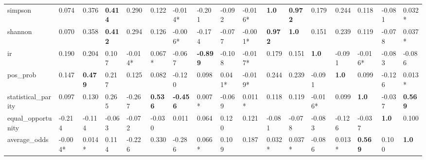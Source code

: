 \begin{tabular}{lllllllllllllllll}
simpson & 0.074 & 0.376 & \cellcolor{black!25}\textbf{0.414} & 0.290 & 0.122 & -0.014* & -0.201 & -0.092 & -0.016* & \cellcolor{black!25}\textbf{1.0} & \cellcolor{black!25}\textbf{0.972} & 0.179 & 0.244 & 0.118 & -0.081 & 0.032* \\
shannon & 0.070 & 0.358 & \cellcolor{black!25}\textbf{0.412} & 0.294 & 0.126 & -0.006* & -0.174 & -0.077 & -0.001* & \cellcolor{black!25}\textbf{0.972} & \cellcolor{black!25}\textbf{1.0} & 0.151 & 0.239 & 0.119 & -0.078 & 0.037* \\
ir & 0.190 & 0.204 & 0.107 & -0.014* & 0.067* & -0.067 & \cellcolor{black!25}\textbf{-0.899} & -0.108 & -0.017* & 0.179 & 0.151 & \cellcolor{black!25}\textbf{1.0} & -0.091 & -0.016* & -0.083 & -0.086 \\
pos_prob & 0.147 & \cellcolor{black!25}\textbf{0.479} & 0.217 & 0.125 & 0.082 & -0.120 & 0.098 & 0.041* & -0.019* & 0.244 & 0.239 & -0.091 & \cellcolor{black!25}\textbf{1.0} & 0.099 & -0.126 & 0.013* \\
statistical_parity & 0.097 & 0.130 & 0.265 & -0.267 & \cellcolor{black!25}\textbf{0.536} & \cellcolor{black!25}\textbf{-0.456} & 0.007* & -0.069 & 0.011* & 0.118 & 0.119 & -0.016* & 0.099 & \cellcolor{black!25}\textbf{1.0} & -0.037 & \cellcolor{black!25}\textbf{0.569} \\
equal_opportunity & -0.214 & -0.114 & -0.063 & -0.072 & -0.030 & 0.011 & 0.064 & 0.120 & 0.121 & -0.081 & -0.078 & -0.083 & -0.126 & -0.037 & \cellcolor{black!25}\textbf{1.0} & 0.100 \\
average_odds & -0.004* & 0.014* & 0.114 & -0.226 & 0.330 & -0.286 & 0.066* & 0.109 & 0.187 & 0.032* & 0.037* & -0.086 & 0.013* & \cellcolor{black!25}\textbf{0.569} & 0.100 & \cellcolor{black!25}\textbf{1.0} \\
\bottomrule
\end{tabular}
